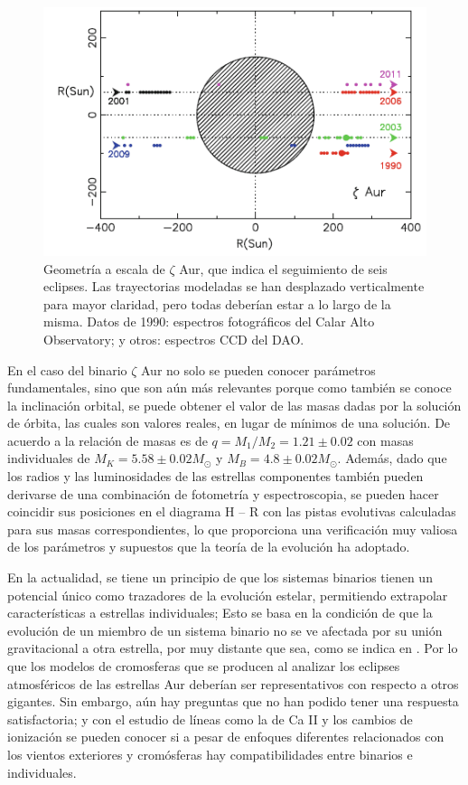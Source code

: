 \documentclass[12pt,oneside,openany,letter]{book}
\begin{document}
\begin{figure}[h]
    \centering
    \includegraphics[width=0.6\linewidth]{Images/Geometria_eclipse.PNG}
    \caption{Geometría a escala de $\zeta$ Aur, que indica el seguimiento de seis eclipses. Las trayectorias modeladas se han desplazado verticalmente para mayor claridad, pero todas deberían estar a lo largo de la misma. Datos de 1990: espectros fotográficos del Calar Alto Observatory; y otros: espectros CCD del DAO.}
    \label{fig:geometria}
\end{figure}

\noindent En el caso del binario $\zeta$ Aur no solo se pueden conocer parámetros fundamentales, sino que son aún más relevantes porque como también se conoce la inclinación orbital, se puede obtener el valor de las masas dadas por la solución de órbita, las cuales son valores reales, en lugar de mínimos de una solución. De acuerdo a \citep{bennett1995non} la relación de masas es de $q = M_1/M_2 = 1.21 \pm 0.02$ con masas individuales de $M_K = 5.58 \pm 0.02 M_\odot$ y $M_B = 4.8  \pm 0.02 M_{\odot}$. Además, dado que los radios y las luminosidades de las estrellas componentes también pueden derivarse de una combinación de fotometría y espectroscopia, se pueden hacer coincidir sus posiciones en el diagrama H – R con las pistas evolutivas calculadas \citep{schroder1997critical} para sus masas correspondientes, lo que proporciona una verificación muy valiosa de los parámetros y supuestos que la teoría de la evolución ha adoptado.

\noindent En la actualidad, se tiene un principio de que los sistemas binarios tienen un potencial único como trazadores de la evolución estelar, permitiendo extrapolar características a estrellas individuales; Esto se basa en la condición de que la evolución de un miembro de un sistema binario no se ve afectada por su unión gravitacional a otra estrella, por muy distante que sea, como se indica en \citep{schroder1997critical}. Por lo que los modelos de cromosferas que se producen al analizar los eclipses atmosféricos de las estrellas Aur deberían ser representativos con respecto a otros gigantes. Sin embargo, aún hay preguntas que no han podido tener una respuesta satisfactoria; y con el estudio de líneas como la de Ca II y los cambios de ionización se pueden conocer si a pesar de enfoques diferentes relacionados con los vientos exteriores y cromósferas hay compatibilidades entre binarios e individuales.
\end{document}

